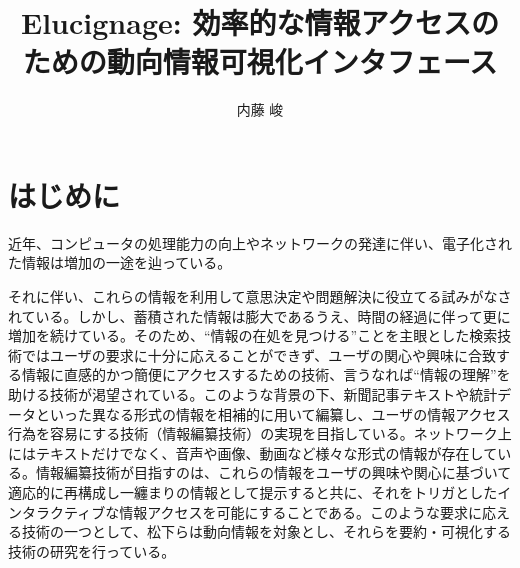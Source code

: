 \documentclass{matsushita-zemi}
\title{Elucignage: 効率的な情報アクセスのための動向情報可視化インタフェース}
\author{内藤 峻}
\begin{document}
\maketitle


\section{はじめに}
\label{background}

近年、コンピュータの処理能力の向上やネットワークの発達に伴い、電子化された情報は増加の一途を辿っている。
それに伴い、これらの情報を利用して意思決定や問題解決に役立てる試みがなされている。しかし、蓄積された情報は膨大であるうえ、時間の経過に伴って更に増加を続けている。そのため、“情報の在処を見つける”ことを主眼とした検索技術ではユーザの要求に十分に応えることができず、ユーザの関心や興味に合致する情報に直感的かつ簡便にアクセスするための技術、言うなれば“情報の理解”を助ける技術が渇望されている。このような背景の下、新聞記事テキストや統計データといった異なる形式の情報を相補的に用いて編纂し、ユーザの情報アクセス行為を容易にする技術（情報編纂技術）の実現を目指している\cite{information_compilation}。ネットワーク上にはテキストだけでなく、音声や画像、動画など様々な形式の情報が存在している。情報編纂技術が目指すのは、これらの情報をユーザの興味や関心に基づいて適応的に再構成し一纏まりの情報として提示すると共に、それをトリガとしたインタラクティブな情報アクセスを可能にすることである。このような要求に応える技術の一つとして、松下らは動向情報を対象とし、それらを要約・可視化する技術の研究を行っている\cite{STEND}。
\end{document}
